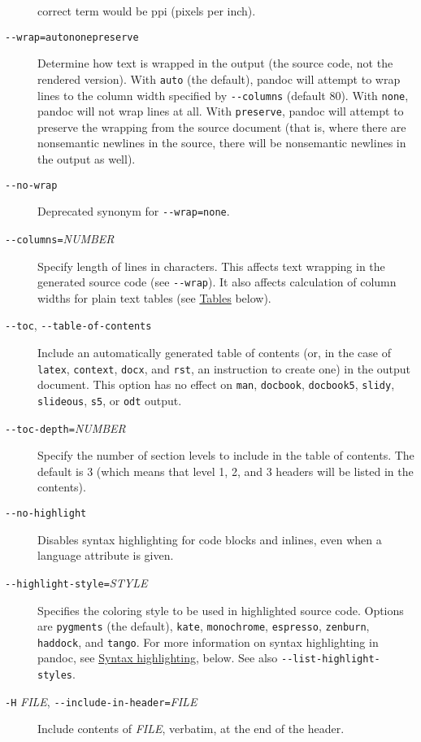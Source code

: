 \documentclass[]{article}
\begin{document}
\begin{description}
correct term would be ppi (pixels per inch).
\item[\texttt{-\/-wrap=auto}\textbar{}\texttt{none}\textbar{}\texttt{preserve}]
Determine how text is wrapped in the output (the source code, not the
rendered version). With \texttt{auto} (the default), pandoc will attempt
to wrap lines to the column width specified by \texttt{-\/-columns}
(default 80). With \texttt{none}, pandoc will not wrap lines at all.
With \texttt{preserve}, pandoc will attempt to preserve the wrapping
from the source document (that is, where there are nonsemantic newlines
in the source, there will be nonsemantic newlines in the output as
well).
\item[\texttt{-\/-no-wrap}]
Deprecated synonym for \texttt{-\/-wrap=none}.
\item[\texttt{-\/-columns=}\emph{NUMBER}]
Specify length of lines in characters. This affects text wrapping in the
generated source code (see \texttt{-\/-wrap}). It also affects
calculation of column widths for plain text tables (see
\protect\hyperlink{tables}{Tables} below).
\item[\texttt{-\/-toc}, \texttt{-\/-table-of-contents}]
Include an automatically generated table of contents (or, in the case of
\texttt{latex}, \texttt{context}, \texttt{docx}, and \texttt{rst}, an
instruction to create one) in the output document. This option has no
effect on \texttt{man}, \texttt{docbook}, \texttt{docbook5},
\texttt{slidy}, \texttt{slideous}, \texttt{s5}, or \texttt{odt} output.
\item[\texttt{-\/-toc-depth=}\emph{NUMBER}]
Specify the number of section levels to include in the table of
contents. The default is 3 (which means that level 1, 2, and 3 headers
will be listed in the contents).
\item[\texttt{-\/-no-highlight}]
Disables syntax highlighting for code blocks and inlines, even when a
language attribute is given.
\item[\texttt{-\/-highlight-style=}\emph{STYLE}]
Specifies the coloring style to be used in highlighted source code.
Options are \texttt{pygments} (the default), \texttt{kate},
\texttt{monochrome}, \texttt{espresso}, \texttt{zenburn},
\texttt{haddock}, and \texttt{tango}. For more information on syntax
highlighting in pandoc, see
\protect\hyperlink{syntax-highlighting}{Syntax highlighting}, below. See
also \texttt{-\/-list-highlight-styles}.
\item[\texttt{-H} \emph{FILE},
\texttt{-\/-include-in-header=}\emph{FILE}]
Include contents of \emph{FILE}, verbatim, at the end of the header.

\end{description}
\end{document}
